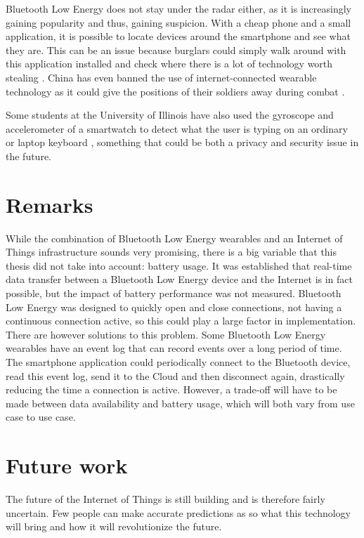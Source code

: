 \documentclass[pdftex,a4paper,12pt,twoside]{report}
\begin{document}
Bluetooth Low Energy does not stay under the radar either, as it is increasingly gaining popularity and thus, gaining suspicion. With a cheap phone and a small application, it is possible to locate devices around the smartphone and see what they are. This can be an issue because burglars could simply walk around with this application installed and check where there is a lot of technology worth stealing \citep{ashford2015}. China has even banned the use of internet-connected wearable technology as it could give the positions of their soldiers away during combat \citep{bbcnews2015}.

Some students at the University of Illinois have also used the gyroscope and accelerometer of a smartwatch to detect what the user is typing on an ordinary or laptop keyboard \citep{wang2015mole}, something that could be both a privacy and security issue in the future.

\section{Remarks}
\label{sec:remarks}
While the combination of Bluetooth Low Energy wearables and an Internet of Things infrastructure sounds very promising, there is a big variable that this thesis did not take into account: battery usage. It was established that real-time data transfer between a Bluetooth Low Energy device and the Internet is in fact possible, but the impact of battery performance was not measured. Bluetooth Low Energy was designed to quickly open and close connections, not having a continuous connection active, so this could play a large factor in implementation. There are however solutions to this problem. Some Bluetooth Low Energy wearables have an event log that can record events over a long period of time. The smartphone application could periodically connect to the Bluetooth device, read this event log, send it to the Cloud and then disconnect again, drastically reducing the time a connection is active. However, a trade-off will have to be made between data availability and battery usage, which will both vary from use case to use case.

\section{Future work}
\label{sec:futurework}
The future of the Internet of Things is still building and is therefore fairly uncertain. Few people can make accurate predictions as so what this technology will bring and how it will revolutionize the future.
\end{document}
